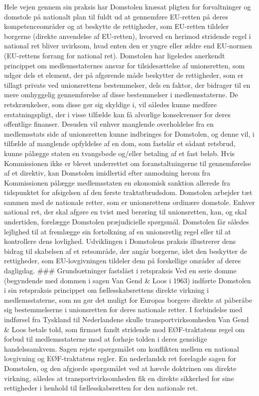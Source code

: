\documentclass[]{book}
\begin{document}
Hele vejen gennem sin praksis har Domstolen knæsat pligten for forvaltninger og domstole på nationalt plan til fuldt ud at gennemføre EU-retten på deres kompetenceområder og at beskytte de rettigheder, som EU-retten tildeler borgerne (direkte anvendelse af EU-retten), hvorved en herimod stridende regel i national ret bliver uvirksom, hvad enten den er yngre eller ældre end EU-normen (EU-rettens forrang for national ret).
Domstolen har ligeledes anerkendt princippet om medlemsstaternes ansvar for tilsidesættelse af unionsretten, som udgør dels et element, der på afgørende måde beskytter de rettigheder, som er tillagt private ved unionsrettens bestemmelser, dels en faktor, der bidrager til en mere omhyggelig gennemførelse af disse bestemmelser i medlemsstaterne. De retskrænkelser, som disse gør sig skyldige i, vil således kunne medføre erstatningspligt, der i visse tilfælde kan få alvorlige konsekvenser for deres offentlige finanser. Desuden vil enhver manglende overholdelse fra en medlemsstats side af unionsretten kunne indbringes for Domstolen, og denne vil, i tilfælde af manglende opfyldelse af en dom, som fastslår et sådant retsbrud, kunne pålægge staten en tvangsbøde og/eller betaling af et fast beløb. Hvis Kommissionen ikke er blevet underrettet om foranstaltningerne til gennemførelse af et direktiv, kan Domstolen imidlertid efter anmodning herom fra Kommissionen pålægge medlemsstaten en økonomisk sanktion allerede fra tidspunktet for afsigelsen af den første traktatbrudsdom.
Domstolen arbejder tæt sammen med de nationale retter, som er unionsrettens ordinære domstole. Enhver national ret, der skal afgøre en tvist med berøring til unionsretten, kan, og skal undertiden, forelægge Domstolen præjudicielle spørgsmål. Domstolen får således lejlighed til at fremlægge sin fortolkning af en unionsretlig regel eller til at kontrollere dens lovlighed.
Udviklingen i Domstolens praksis illustrerer dens bidrag til skabelsen af et retsområde, der angår borgerne, idet den beskytter de rettigheder, som EU-lovgivningen tildeler dem på forskellige områder af deres dagligdag.
\#\#\# Grundsætninger fastslået i retspraksis
Ved en serie domme (begyndende med dommen i sagen Van Gend \& Loos i 1963) indførte Domstolen i sin retspraksis princippet om fællesskabsrettens direkte virkning i medlemsstaterne, som nu gør det muligt for Europas borgere direkte at påberåbe sig bestemmelserne i unionsretten for deres nationale retter.
I forbindelse med indførsel fra Tyskland til Nederlandene skulle transportvirksomheden Van Gend \& Loos betale told, som firmaet fandt stridende mod EØF-traktatens regel om forbud til medlemsstaterne mod at forhøje tolden i deres gensidige handelssamkvem. Sagen rejste spørgsmålet om konflikten mellem en national lovgivning og EØF-traktatens regler. En nederlandsk ret forelagde sagen for Domstolen, og den afgjorde spørgsmålet ved at hævde doktrinen om direkte virkning, således at transportvirksomheden fik en direkte sikkerhed for sine rettigheder i henhold til fællesskabsretten for den nationale ret.
\end{document}
